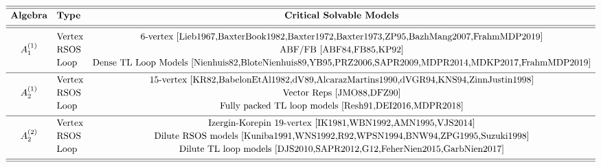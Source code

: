 \documentclass[11pt]{article}
\numberwithin{equation}{section}
\theoremstyle{plain}
\numberwithin{equation}{section}
\begin{document}
\begin{table}[ht]
\begin{eqnarray}
{\begin{array}{clc}
\hline\hline\\[-10pt]
\mbox{\bf Algebra}&\mbox{\bf Type}&\mbox{\bf Critical Solvable Models}\\[4pt]
\hline\hline\\[-8pt]
&\mbox{Vertex}&\mbox{6-vertex~\cite{Lieb1967,BaxterBook1982,Baxter1972,Baxter1973,ZP95,BazhMang2007,FrahmMDP2019}}\\
A_1^{(1)}&\mbox{RSOS}&\mbox{ABF/FB~\cite{ABF84,FB85,KP92}}\\[2pt]
&\mbox{Loop}&\mbox{Dense TL Loop Models~\cite{Nienhuis82,BloteNienhuis89,YB95,PRZ2006,SAPR2009,MDPR2014,MDKP2017,FrahmMDP2019}}\\[4pt]
\hline\\[-10pt]
&\mbox{Vertex}&\mbox{15-vertex~\cite{KR82,BabelonEtAl1982,dV89,AlcarazMartins1990,dVGR94,KNS94,ZinnJustin1998}}\\
A_2^{(1)}&\mbox{RSOS}&\mbox{Vector Reps~\cite{JMO88,DFZ90}}\\[2pt]
&\mbox{Loop}&\mbox{Fully packed TL loop models~\cite{Resh91,DEI2016,MDPR2018}}\\[4pt]
\hline\\[-10pt]
&\mbox{Vertex} &\mbox{Izergin-Korepin 19-vertex~\cite{IK1981,WBN1992,AMN1995,VJS2014}}\\
A_2^{(2)}&\mbox{RSOS}&\mbox{Dilute RSOS models~\cite{Kuniba1991,WNS1992,R92,WPSN1994,BNW94,ZPG1995,Suzuki1998}}\\[2pt]
&\mbox{Loop}&\mbox{Dilute TL loop models~\cite{DJS2010,SAPR2012,G12,FeherNien2015,GarbNien2017}}\\[4pt]
\hline\hline\vspace{-22pt}
\end{array}}
\nonumber
\end{eqnarray}
\caption{The different realisations of the $A_1^{(1)}$, $A_2^{(1)}$ and $A_2^{(2)}$ models. Some key references are given for studies of these models including the $T$- and $Y$-systems, $T$-$Q$ equations and Bethe ansatz.}
\end{table}
\end{document}
